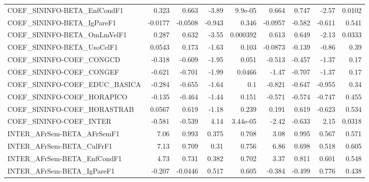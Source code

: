 \begin{tabular}{lrrrrrrrr}
COEF\_SININFO-BETA\_EnfCondF1           &       0.323 &        0.663 &    -3.89 &  9.9e-05 &      0.664 &       0.747 &        -2.57 &        0.0102 \\
COEF\_SININFO-BETA\_IgPareF1            &     -0.0177 &      -0.0508 &   -0.943 &    0.346 &    -0.0957 &      -0.582 &       -0.611 &         0.541 \\
COEF\_SININFO-BETA\_OmLmVelF1           &       0.287 &        0.632 &    -3.55 & 0.000392 &      0.613 &       0.649 &        -2.13 &        0.0333 \\
COEF\_SININFO-BETA\_UsoCelF1            &      0.0543 &        0.173 &    -1.63 &    0.103 &    -0.0873 &      -0.139 &        -0.86 &          0.39 \\
COEF\_SININFO-COEF\_CONGCD              &      -0.318 &       -0.609 &    -1.95 &    0.051 &     -0.513 &      -0.457 &        -1.37 &          0.17 \\
COEF\_SININFO-COEF\_CONGEF              &      -0.621 &       -0.701 &    -1.99 &   0.0466 &      -1.47 &      -0.707 &        -1.37 &          0.17 \\
COEF\_SININFO-COEF\_EDUC\_BASICA         &      -0.284 &       -0.655 &    -1.64 &      0.1 &     -0.821 &      -0.647 &       -0.955 &          0.34 \\
COEF\_SININFO-COEF\_HORAPICO            &      -0.135 &       -0.464 &    -1.44 &    0.151 &     -0.571 &      -0.574 &       -0.747 &         0.455 \\
COEF\_SININFO-COEF\_HORASTRAB           &      0.0567 &        0.619 &    -1.18 &    0.239 &      0.191 &       0.619 &       -0.623 &         0.534 \\
COEF\_SININFO-COEF\_INTER               &      -0.581 &       -0.539 &     4.14 & 3.44e-05 &      -2.42 &      -0.633 &         2.15 &        0.0318 \\
INTER\_AFrSem-BETA\_AFrSemF1            &        7.06 &        0.993 &    0.375 &    0.708 &       3.08 &       0.995 &        0.567 &         0.571 \\
INTER\_AFrSem-BETA\_CulFrF1             &        7.13 &        0.709 &     0.31 &    0.756 &       6.86 &       0.698 &        0.518 &         0.605 \\
INTER\_AFrSem-BETA\_EnfCondF1           &        4.73 &        0.731 &    0.382 &    0.702 &       3.37 &       0.811 &        0.601 &         0.548 \\
INTER\_AFrSem-BETA\_IgPareF1            &      -0.207 &      -0.0446 &    0.517 &    0.605 &     -0.384 &      -0.499 &        0.776 &         0.438 \\

\end{tabular}
